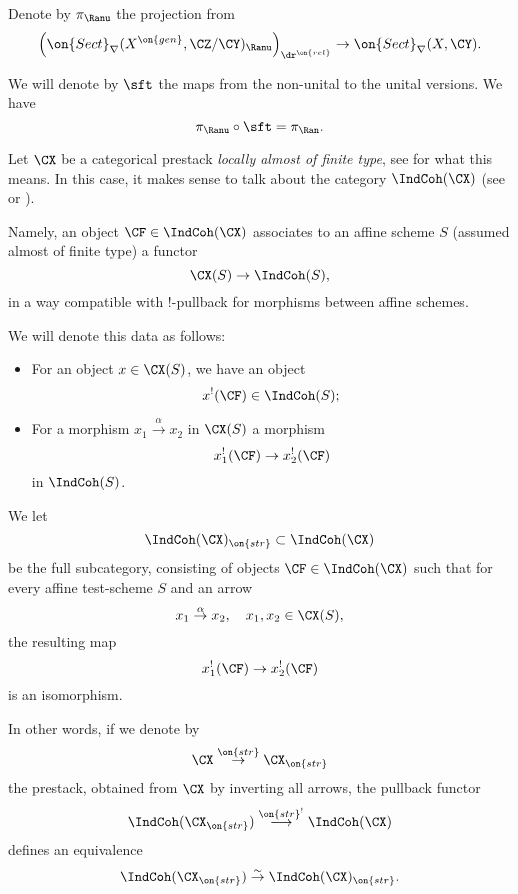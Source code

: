 \documentclass[9pt]{amsart}
\theoremstyle{remark}
\theoremstyle{definition}
\theoremstyle{remark}
\numberwithin{equation}{section}
\begin{document}
\medskip

Denote by $\pi_\Ranu$ the projection from 
$$\left(\on{Sect}_\nabla(X^{\on{gen}},\CZ/\CY)_\Ranu\right)_{\dr^{\on{rel}}}\to 
\on{Sect}_\nabla(X,\CY).$$

\sssec{}

We will denote by $\sft$ the maps from the non-unital to the unital versions. We have
$$\pi_\Ranu\circ \sft=\pi_\Ran.$$


\sssec{}

Let $\CX$ be a categorical prestack \emph{locally almost of finite type}, see \cite[Sect. C.1.3]{Ro} for what this means. 
In this case, it makes sense to talk about the category $\IndCoh(\CX)$ (see \cite[Sect. 2.2]{Ga4} or \cite[Sect. C.3]{Ro}).

\medskip

Namely, an object $\CF\in \IndCoh(\CX)$ associates to an affine scheme $S$ (assumed almost of finite type) a functor
$$\CX(S)\to \IndCoh(S),$$
in a way compatible with !-pullback for morphisms between affine schemes.

\medskip

We will denote this data as follows: 

\begin{itemize}

\item For an object $x\in \CX(S)$, we have an object 
$$x^!(\CF)\in \IndCoh(S);$$

\item For a morphism $x_1\overset{\alpha}\to x_2$ in $\CX(S)$ a morphism
$$x_1^!(\CF)\to x_2^!(\CF)$$
in $\IndCoh(S)$.

\end{itemize}

\sssec{}

We let 
$$\IndCoh(\CX)_{\on{str}}\subset \IndCoh(\CX)$$
be the full subcategory, consisting of objects $\CF\in \IndCoh(\CX)$ such that for every affine 
test-scheme $S$ and an arrow
$$x_1\overset{\alpha}\to x_2, \quad x_1,x_2\in \CX(S),$$
the resulting map
$$x_1^!(\CF)\to x_2^!(\CF)$$
is an isomorphism.

\medskip

In other words, if we denote by 
$$\CX \overset{\on{str}}\to \CX_{\on{str}}$$ the prestack, obtained from $\CX$ by inverting all arrows, the 
pullback functor
$$\IndCoh(\CX_{\on{str}})\overset{\on{str}^!}\longrightarrow \IndCoh(\CX)$$
defines an equivalence
$$\IndCoh(\CX_{\on{str}})\overset{\sim}\to \IndCoh(\CX)_{\on{str}}.$$
\end{document}
